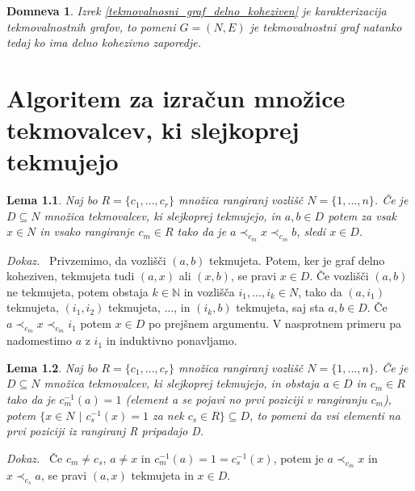 \documentclass[a4paper, 12pt]{book}
\newtheorem{lema}{Lema}[chapter]
\newtheorem{domneva}{Domneva}[chapter]
\newenvironment{dokaz}{\emph{Dokaz.}\ }{\hspace{\fill}{$\Box$}}
\begin{document}
\begin{domneva}
    Izrek \ref{tekmovalnosni_graf_delno_koheziven} je karakterizacija tekmovalnostnih grafov, to pomeni $G = (N, E)$ je tekmovalnostni graf natanko tedaj ko ima delno kohezivno zaporedje.
\end{domneva}

\chapter{ Algoritem za izračun množice tekmovalcev, ki slejkoprej tekmujejo }

\begin{lema}
\label{lema_algoritem_tekmovalci_ki_slejkoprej_tekmujejo_1}
    Naj bo $R = \{ c_1, ..., c_r \}$ množica rangiranj vozlišč $N = \{ 1, ..., n \}$. Če je $D \subseteq N$ množica tekmovalcev, ki slejkoprej tekmujejo, in $a, b \in D$ potem za vsak $x \in N$ in vsako rangiranje $c_m \in R$ tako da je $a \prec_{c_m} x \prec_{c_m} b$, sledi $x \in D$.
\end{lema}
\begin{dokaz}
    Privzemimo, da vozlišči $(a, b)$ tekmujeta. Potem, ker je graf delno koheziven, tekmujeta tudi $(a, x)$ ali $(x, b)$, se pravi $x \in D$. Če vozlišči $(a, b)$ ne tekmujeta, potem obstaja $k \in \mathbb{N}$ in vozlišča $i_1, ..., i_k \in N$, tako da $(a, i_1)$ tekmujeta, $(i_1, i_2)$ tekmujeta, ..., in $(i_k, b)$ tekmujeta, saj sta $a,b \in D$. Če $a \prec_{c_m} x \prec_{c_m} i_1$ potem $x \in D$ po prejšnem argumentu. V nasprotnem primeru pa nadomestimo $a$ z $i_1$ in induktivno ponavljamo.
\end{dokaz}

\begin{lema}
\label{lema_algoritem_tekmovalci_ki_slejkoprej_tekmujejo_2}
    Naj bo $R = \{ c_1, ..., c_r \}$ množica rangiranj vozlišč $N = \{ 1, ..., n \}$. Če je $D \subseteq N$ množica tekmovalcev, ki slejkoprej tekmujejo, in obstaja $a \in D$ in  $c_m \in R$ tako da je $c_m^{-1}(a) = 1$ (element a se pojavi no prvi poziciji v rangiranju $c_m$), potem $\{ x \in N$ $|$ $c_s^{-1}(x) = 1$ za nek $c_s \in R \} \subseteq D$, to pomeni da vsi elementi na prvi poziciji iz rangiranj R pripadajo D.
\end{lema}
\begin{dokaz}
    Če $c_m \neq c_s$,  $a \neq x$ in $c_m^{-1}(a) = 1 = c_s^{-1}(x)$, potem je $a \prec_{c_m} x$ in $x \prec_{c_s} a$, se pravi $(a, x)$ tekmujeta in $x \in D$. 
\end{dokaz}
\end{document}
